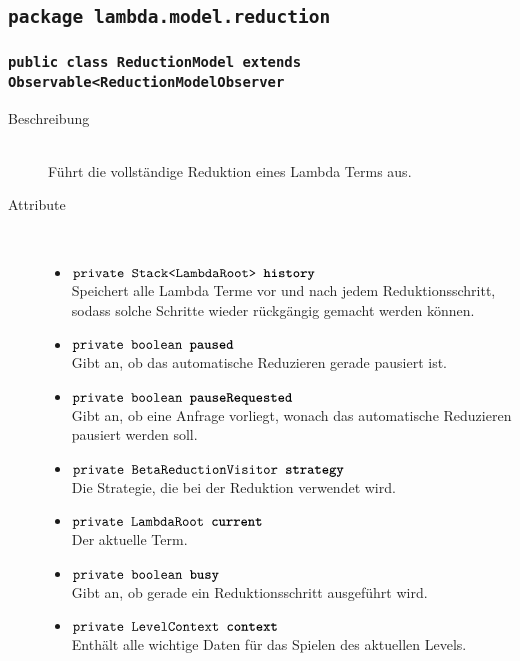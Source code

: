 \subsection{\texttt{package lambda.model.reduction}}

\subsubsection{\normalfont \texttt{public class \textbf{ReductionModel} extends Observable<ReductionModelObserver}}

\begin{description}
\item[Beschreibung] \hfill \\ Führt die vollständige Reduktion eines Lambda Terms aus.

\item[Attribute] \hfill \\
	\vspace{-.8cm}
	\begin{itemize}
		\item $\texttt{private Stack<LambdaRoot> \textbf{history}}$ \\ Speichert alle Lambda Terme vor und nach jedem Reduktionsschritt, sodass solche Schritte wieder rückgängig gemacht werden können.
		\item $\texttt{private boolean \textbf{paused}}$ \\ Gibt an, ob das automatische Reduzieren gerade pausiert ist.
		\item $\texttt{private boolean \textbf{pauseRequested}}$ \\ Gibt an, ob eine Anfrage vorliegt, wonach das automatische Reduzieren pausiert werden soll.
		\item $\texttt{private BetaReductionVisitor \textbf{strategy}}$ \\ Die Strategie, die bei der Reduktion verwendet wird.
		\item $\texttt{private LambdaRoot \textbf{current}}$ \\ Der aktuelle Term.
		\item $\texttt{private boolean \textbf{busy}}$ \\ Gibt an, ob gerade ein Reduktionsschritt ausgeführt wird.
		\item $\texttt{private LevelContext \textbf{context}}$ \\ Enthält alle wichtige Daten für das Spielen des aktuellen Levels.
	\end{itemize}
	

\end{description}
